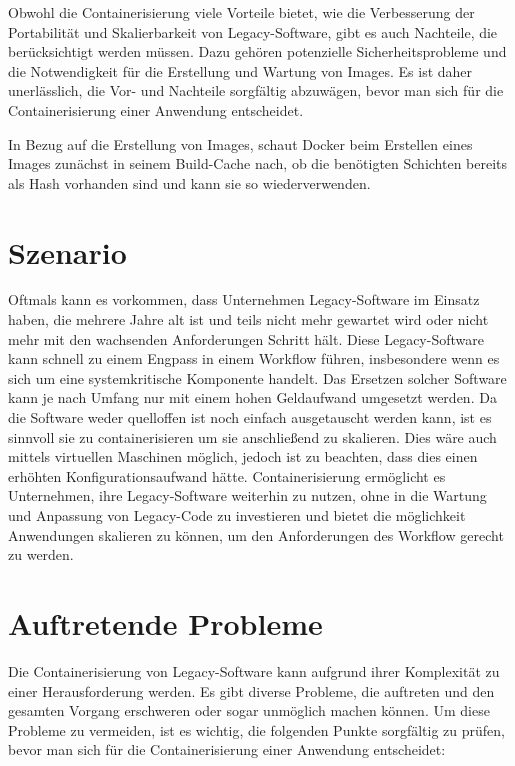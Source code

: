 Obwohl die Containerisierung viele Vorteile bietet, wie die Verbesserung der Portabilität und Skalierbarkeit von Legacy-Software, gibt es auch Nachteile, die berücksichtigt werden müssen. Dazu gehören potenzielle Sicherheitsprobleme und die Notwendigkeit für die Erstellung und Wartung von Images. Es ist daher unerlässlich, die Vor- und Nachteile sorgfältig abzuwägen, bevor man sich für die Containerisierung einer Anwendung entscheidet.

In Bezug auf die Erstellung von Images, schaut Docker beim Erstellen eines Images zunächst in seinem Build-Cache nach, ob die benötigten Schichten bereits als Hash vorhanden sind und kann sie so wiederverwenden.

\section{Szenario}

Oftmals kann es vorkommen, dass Unternehmen Legacy-Software im Einsatz haben, die mehrere Jahre alt ist und teils nicht mehr gewartet wird oder nicht mehr mit den wachsenden Anforderungen Schritt hält. Diese Legacy-Software kann schnell zu einem Engpass in einem Workflow führen, insbesondere wenn es sich um eine systemkritische Komponente handelt. Das Ersetzen solcher Software kann je nach Umfang nur mit einem hohen Geldaufwand umgesetzt werden. Da die Software weder quelloffen ist noch einfach ausgetauscht werden kann, ist es sinnvoll sie zu containerisieren um sie anschließend zu skalieren. Dies wäre auch mittels virtuellen Maschinen möglich, jedoch ist zu beachten, dass dies einen erhöhten Konfigurationsaufwand hätte. Containerisierung ermöglicht es Unternehmen, ihre Legacy-Software weiterhin zu nutzen, ohne in die Wartung und Anpassung von Legacy-Code zu investieren und bietet die möglichkeit Anwendungen skalieren zu können, um den Anforderungen des Workflow gerecht zu werden.

\section{Auftretende Probleme}

Die Containerisierung von Legacy-Software kann aufgrund ihrer Komplexität zu einer Herausforderung werden. Es gibt diverse Probleme, die auftreten und den gesamten Vorgang erschweren oder sogar unmöglich machen können. Um diese Probleme zu vermeiden, ist es wichtig, die folgenden Punkte sorgfältig zu prüfen, bevor man sich für die Containerisierung einer Anwendung entscheidet: \\


